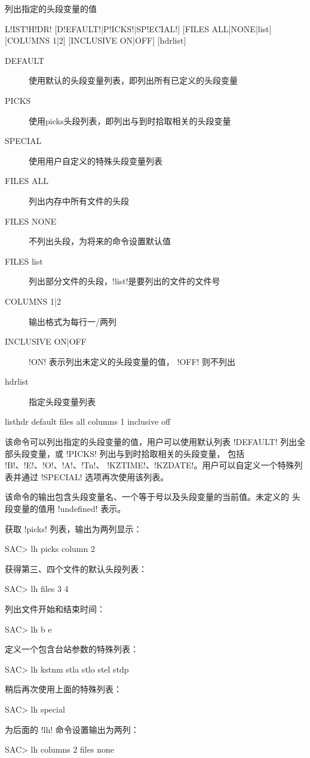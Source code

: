 \label{cmd:listhdr}

列出指定的头段变量的值

\begin{SACSTX}
L!IST!H!DR! [D!EFAULT!|P!ICKS!|SP!ECIAL!] [FILES ALL|NONE|list] [COLUMNS 1|2]
    [INCLUSIVE ON|OFF] [hdrlist]
\end{SACSTX}

\begin{description}
\item [DEFAULT] 使用默认的头段变量列表，即列出所有已定义的头段变量
\item [PICKS] 使用picks头段列表，即列出与到时拾取相关的头段变量
\item [SPECIAL] 使用用户自定义的特殊头段变量列表
\item [FILES ALL] 列出内存中所有文件的头段
\item [FILES NONE] 不列出头段，为将来的命令设置默认值
\item [FILES list] 列出部分文件的头段，!list!是要列出的文件的文件号
\item [COLUMNS 1|2] 输出格式为每行一/两列
\item [INCLUSIVE ON|OFF] !ON! 表示列出未定义的头段变量的值，
    !OFF! 则不列出
\item [hdrlist] 指定头段变量列表
\end{description}

\begin{SACDFT}
listhdr default files all columns 1 inclusive off
\end{SACDFT}

该命令可以列出指定的头段变量的值，用户可以使用默认列表 !DEFAULT!
列出全部头段变量，或 !PICKS! 列出与到时拾取相关的头段变量，
包括 !B!、!E!、!O!、!A!、!Tn!、
!KZTIME!、!KZDATE!。用户可以自定义一个特殊列表并通过
!SPECIAL! 选项再次使用该列表。

该命令的输出包含头段变量名、一个等于号以及头段变量的当前值。未定义的
头段变量的值用 !undefined! 表示。

获取 !picks! 列表，输出为两列显示：
\begin{SACCode}
SAC> lh picks column 2
\end{SACCode}

获得第三、四个文件的默认头段列表：
\begin{SACCode}
SAC> lh files 3 4
\end{SACCode}

列出文件开始和结束时间：
\begin{SACCode}
SAC> lh b e
\end{SACCode}

定义一个包含台站参数的特殊列表：
\begin{SACCode}
SAC> lh kstnm stla stlo stel stdp
\end{SACCode}

稍后再次使用上面的特殊列表：
\begin{SACCode}
SAC> lh special
\end{SACCode}

为后面的 !lh! 命令设置输出为两列：
\begin{SACCode}
SAC> lh columns 2 files none
\end{SACCode}

